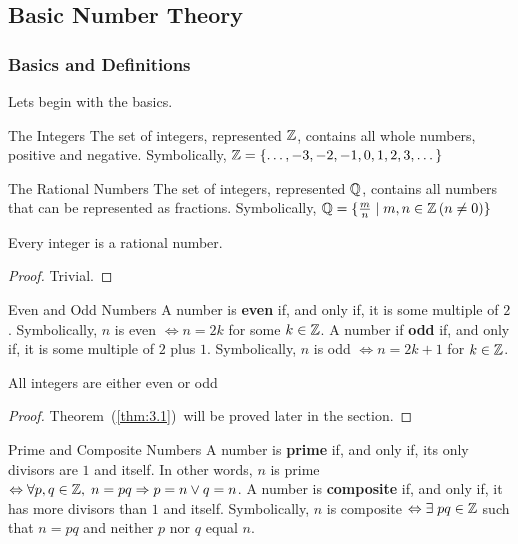 \subsection{Basic Number Theory}
\subsubsection{Basics and Definitions}
Lets begin with the basics.

\begin{definition}{The Integers}{}
    The set of integers, represented $\mathbb Z$, contains all whole numbers, positive and negative. Symbolically, $\mathbb Z = \{\dots, -3, -2, -1, 0, 1, 2, 3, \dots\}$
\end{definition}

\begin{definition}{The Rational Numbers}{}
    The set of integers, represented $\mathbb Q$, contains all numbers that can be represented as fractions. Symbolically, $\mathbb Q = \{\frac{m}{n} \mid m, n \in \mathbb Z\left(n \neq 0\right)\}$
\end{definition}

\begin{thm}{}
    Every integer is a rational number.
    \begin{proof}
        Trivial.
    \end{proof}
\end{thm}

\begin{definition}{Even and Odd Numbers}{}
    A number is \textbf{even} if, and only if, it is some multiple of $2$. Symbolically, $n$ is even $\Leftrightarrow n=2k$ for some $k \in \mathbb Z$. A number if \textbf{odd} if, and only if, it is some multiple of $2$ plus $1$. Symbolically, $n$ is odd $\Leftrightarrow n=2k+1$ for $k\in\mathbb Z$.
\end{definition}

\begin{thm}{}{\label{thm:3.1}}
    All integers are either even or odd
    \begin{proof}
        Theorem~(\ref{thm:3.1})~will be proved later in the section.
    \end{proof}
\end{thm}

\begin{definition}{Prime and Composite Numbers}{}
    A number is \textbf{prime} if, and only if, its only divisors are $1$ and itself. In other words, $n$ is prime $\Leftrightarrow \forall p, q \in \mathbb Z, \hspace{0.1cm} n=pq \Rightarrow p=n \lor q=n$. A number is \textbf{composite} if, and only if, it has more divisors than $1$ and itself. Symbolically, $n$ is composite $\Leftrightarrow \exists \hspace{0.1cm} pq \in \mathbb Z$ such that $n=pq$ and neither $p$ nor $q$ equal $n$. 
\end{definition}

